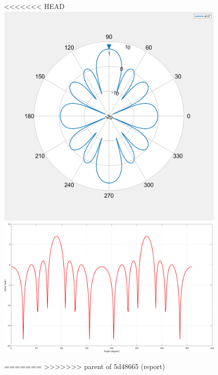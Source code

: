 \documentclass[12pt,a4paper]{article}
\begin{document}
{\begin{center}
\begin{figure}[h]
<<<<<<< HEAD
\includegraphics[scale=0.3]{array_factor_polar.png}
\includegraphics[scale=0.3]{array_factor_rectangular.png}
\caption{{Array factor polar (left) and rectangular (right) diagrams}}
=======
>>>>>>> parent of 5d48665 (report)
		\begin{subfigure}{0.4\linewidth}
		\def\svgwidth{\linewidth}
		\tiny{}
		\caption{}
	\end{subfigure}

\end{figure}
\end{center}}
\end{document}

